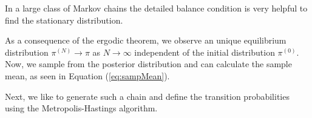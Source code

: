 In a large class of Markov chains the detailed balance condition is very helpful to find the stationary distribution.


As a consequence of the ergodic theorem, we observe an unique equilibrium distribution $\pi^{(N)} \rightarrow \pi$ as $N \rightarrow \infty$ independent of the initial distribution  $\pi^{(0)}$.
Now, we sample from the posterior distribution and can calculate the sample mean, as seen in Equation (\ref{eq:sampMean}).

Next, we like to generate such a chain and define the transition probabilities using the Metropolis-Hastings algorithm.




